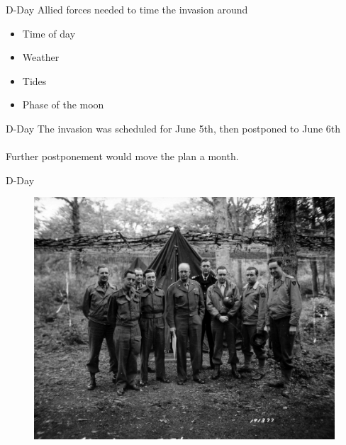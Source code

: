\documentclass[hyphens,aspectratio=169]{beamer}
\begin{document}
\begin{frame}[fragile]{D-Day}
Allied forces needed to time the invasion around 
\begin{itemize}
    \item Time of day
    \pause
    \item Weather
    \pause
    \item Tides
    \pause
    \item Phase of the moon
\end{itemize}

\end{frame}

\begin{frame}[fragile]{D-Day}
The invasion was scheduled for June 5th, 
\pause
then postponed to June 6th
\pause 
\\\\Further postponement would move the plan a month.
\end{frame}

\begin{frame}[fragile]{D-Day}
\begin{center}
    \begin{figure}
        \includegraphics[scale=0.21]{paper/images/general_eisenhower.jpg}
    \end{figure}
    \small
    \caption{General Eisenhower's advance command post near Southwick House}
\end{center}
\end{frame}
\end{document}
